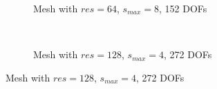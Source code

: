 \begin{figure}[H]
    \begin{subfigure}[b]{1\linewidth}
        \centering
        \caption{Mesh with $res=64$, $s_{max}=8$, 152 DOFs}
    \end{subfigure}
    \\
    \begin{subfigure}[b]{1\linewidth}
        \centering
        \caption{Mesh with $res=128$, $s_{max}=4$, 272 DOFs}
    \end{subfigure}
\end{figure}


